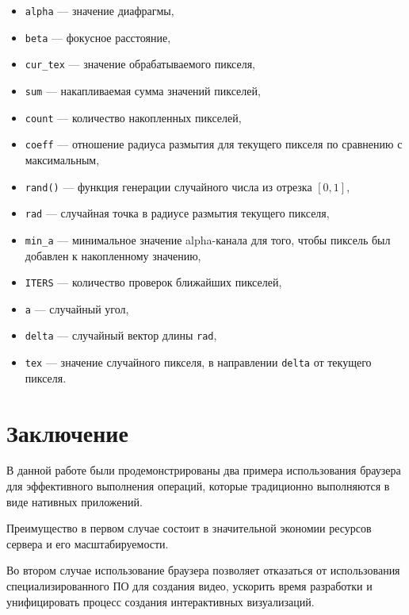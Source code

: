 \begin{itemize}
\item \texttt{alpha} --- значение диафрагмы,
\item \texttt{beta} --- фокусное расстояние,
\item \texttt{cur\_tex} --- значение обрабатываемого пикселя,
\item \texttt{sum} --- накапливаемая сумма значений пикселей,
\item \texttt{count} --- количество накопленных пикселей,
\item \texttt{coeff} --- отношение радиуса размытия для текущего пикселя по сравнению с максимальным,
\item \texttt{rand()} --- функция генерации случайного числа из отрезка $[0, 1]$,
\item \texttt{rad} --- случайная точка в радиусе размытия текущего пикселя,
\item \texttt{min\_a} --- минимальное значение alpha-канала для того, чтобы пиксель был добавлен к накопленному значению,
\item \texttt{ITERS} --- количество проверок ближайших пикселей,
\item \texttt{a} --- случайный угол,
\item \texttt{delta} --- случайный вектор длины \texttt{rad},
\item \texttt{tex} --- значение случайного пикселя, в направлении \texttt{delta} от текущего пикселя.
\end{itemize}

\newpage
\section*{Заключение}
\label{sec:outro}

В данной работе были продемонстрированы два примера использования браузера для эффективного выполнения операций, которые традиционно выполняются в виде нативных приложений.

Преимущество в первом случае состоит в значительной экономии ресурсов сервера и его масштабируемости.

Во втором случае использование браузера позволяет отказаться от использования специализированного ПО для создания видео, ускорить время разработки и унифицировать процесс создания интерактивных визуализаций.

